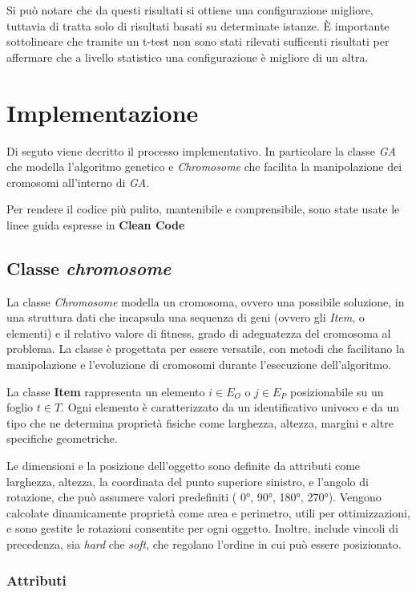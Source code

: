 Si può notare che da questi risultati si ottiene una configurazione migliore, tuttavia di tratta solo di risultati basati su determinate istanze. È importante sottolineare che tramite un t-test non sono stati rilevati sufficenti risultati per affermare che a livello statistico una configurazione è migliore di un altra. 

\section{Implementazione}

Di seguto viene decritto il processo implementativo. In particolare la classe \emph{GA} che modella l'algoritmo genetico e \emph{Chromosome} che facilita la manipolazione dei cromosomi all'interno di \emph{GA}.

Per rendere il codice più pulito, mantenibile e comprensibile, sono state usate le linee guida espresse in \textbf{Clean Code}

\subsection{Classe \emph{chromosome}}

La classe \emph{Chromosome} modella un cromosoma, ovvero una possibile soluzione, in una struttura dati che incapsula una sequenza di geni (ovvero gli \emph{Item}, o elementi) e il relativo valore di fitness, grado di adeguatezza del cromosoma al problema. La classe è progettata per essere versatile, con metodi che facilitano la manipolazione e l'evoluzione di cromosomi durante l'esecuzione dell'algoritmo.

La classe \textbf{Item} rappresenta un elemento \( i \in E_O\) o \( j \in E_P\) posizionabile su un foglio \( t \in T \). Ogni elemento è caratterizzato da un identificativo univoco e da un tipo che ne determina proprietà fisiche come larghezza, altezza, margini e altre specifiche geometriche.

Le dimensioni e la posizione dell'oggetto sono definite da attributi come larghezza, altezza, la coordinata del punto superiore sinistro, e l'angolo di rotazione, che può assumere valori predefiniti ( 0°, 90°, 180°, 270°). Vengono calcolate dinamicamente proprietà come area e perimetro, utili per ottimizzazioni, e sono gestite le rotazioni consentite per ogni oggetto. Inoltre, include vincoli di precedenza, sia \emph{hard} che \emph{soft}, che regolano l'ordine in cui può essere posizionato.

\subsubsection*{Attributi}

